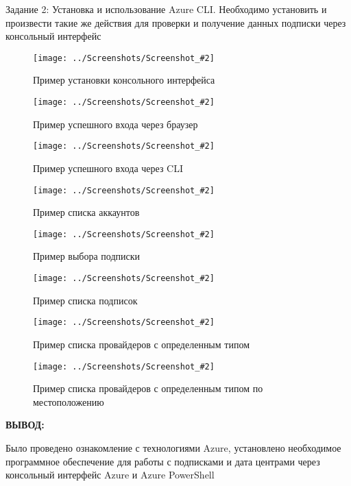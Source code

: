 \documentclass[14pt,a4paper]{extreport}
\newcommand{\screenshot}[2]{\begin{figure}[ht]%
\centering\texttt{[image: ../Screenshots/Screenshot\_\#2]}%
\caption{#1}%
\label{picture#2}%
\end{figure}%
}
\newcommand{\header}[1]{%
{
\fontsize{16pt}{14pt}\selectfont
\begin{center}
\textbf{\MakeUppercase{#1}:}
\end{center}
}
}
\begin{document}
\clearpage
Задание 2: Установка и использование Azure CLI. Необходимо установить и произвести такие же действия для проверки и получение данных подписки через консольный интерфейс

\screenshot{Пример установки консольного интерфейса}{10}
\screenshot{Пример успешного входа через браузер}{11}
\screenshot{Пример успешного входа через CLI}{12}
\screenshot{Пример списка аккаунтов}{13}
\screenshot{Пример выбора подписки}{14}
\screenshot{Пример списка подписок}{15}
\screenshot{Пример списка провайдеров с определенным типом}{16}
\screenshot{Пример списка провайдеров с определенным типом по местоположению}{17}

\clearpage

\header{Вывод}

Было проведено ознакомление с технологиями Azure, установлено необходимое программное обеспечение для работы с подписками и дата центрами через консольный интерфейс Azure и Azure PowerShell
\end{document}
